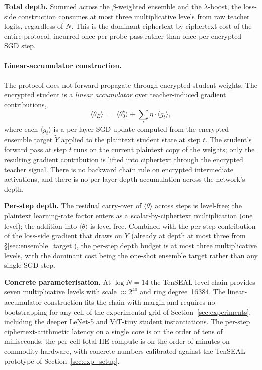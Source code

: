 \par\noindent\textbf{Total depth.} Summed across the $\beta$-weighted ensemble and the $\lambda$-boost, the loss-side construction consumes at most three multiplicative levels from raw teacher logits, regardless of $N$. This is the dominant ciphertext-by-ciphertext cost of the entire protocol, incurred once per probe pass rather than once per encrypted SGD step.

\paragraph{Linear-accumulator construction.}
\label{sec:linear_accumulator}
The protocol does not forward-propagate through encrypted student weights. The encrypted student is a \emph{linear accumulator} over teacher-induced gradient contributions,
\begin{equation}
    \langle\theta_E\rangle \;=\; \langle\theta_0^\star\rangle + \sum_t \eta \cdot \langle g_t\rangle,
    \label{eq:linear_accumulator}
\end{equation}
where each $\langle g_t\rangle$ is a per-layer SGD update computed from the encrypted ensemble target $\widetilde Y$ applied to the plaintext student state at step $t$. The student's forward pass at step $t$ runs on the current plaintext copy of the weights; only the resulting gradient contribution is lifted into ciphertext through the encrypted teacher signal. There is no backward chain rule on encrypted intermediate activations, and there is no per-layer depth accumulation across the network's depth.

\par\noindent\textbf{Per-step depth.} The residual carry-over of $\langle\theta\rangle$ across steps is level-free; the plaintext learning-rate factor enters as a scalar-by-ciphertext multiplication (one level); the addition into $\langle\theta\rangle$ is level-free. Combined with the per-step contribution of the loss-side gradient that draws on $\widetilde Y$ (already at depth at most three from §\ref{sec:ensemble_target}), the per-step depth budget is at most three multiplicative levels, with the dominant cost being the one-shot ensemble target rather than any single SGD step.

\par\noindent\textbf{Concrete parameterisation.} At $\log N = 14$ the TenSEAL level chain provides seven multiplicative levels with scale $\approx 2^{40}$ and ring degree~16384. The linear-accumulator construction fits the chain with margin and requires no bootstrapping for any cell of the experimental grid of Section~\ref{sec:experiments}, including the deeper LeNet-5 and ViT-tiny student instantiations. The per-step ciphertext-arithmetic latency on a single core is on the order of tens of milliseconds; the per-cell total HE compute is on the order of minutes on commodity hardware, with concrete numbers calibrated against the TenSEAL prototype of Section~\ref{sec:exp_setup}.

